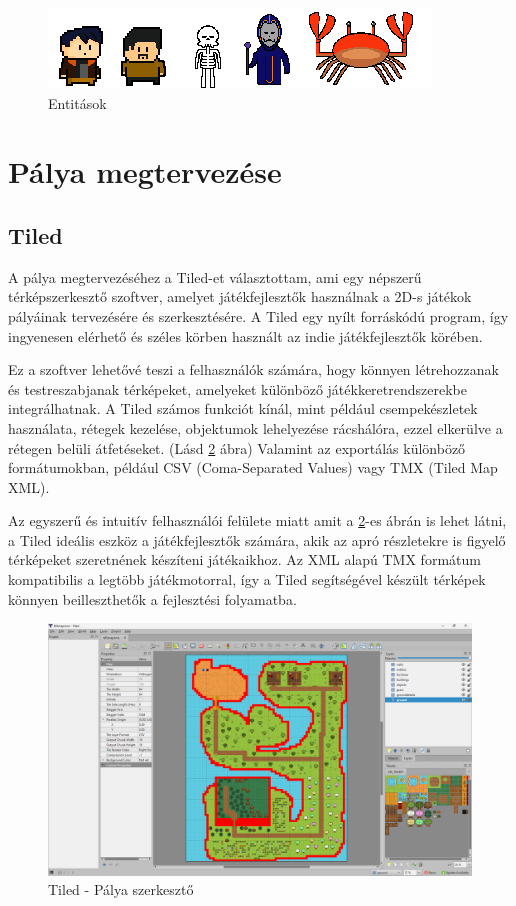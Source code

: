 \begin{figure}[H]
    \centering
    \includegraphics[width=12.0truecm]{images/entities.png}
    \caption{Entitások}
    \label{fig:Entitások}
\end{figure}


\section{Pálya megtervezése}

\subsection{Tiled}
\label{subsec:Tiled}
 A pálya megtervezéséhez a Tiled-et \cite{Tiled} választottam, ami egy népszerű térképszerkesztő szoftver, amelyet játékfejlesztők használnak a 2D-s játékok pályáinak tervezésére és szerkesztésére.   A Tiled egy nyílt forráskódú program, így ingyenesen elérhető és széles körben használt az indie játékfejlesztők körében.

Ez a szoftver lehetővé teszi a felhasználók számára, hogy könnyen létrehozzanak és testreszabjanak térképeket, amelyeket különböző játékkeretrendszerekbe integrálhatnak. A Tiled számos funkciót kínál, mint például csempekészletek használata, rétegek kezelése, objektumok lehelyezése rácshálóra, ezzel elkerülve a rétegen belüli átfetéseket. (Lásd \ref{fig:Tiled} ábra) Valamint az exportálás különböző formátumokban, például CSV (Coma-Separated Values) vagy TMX (Tiled Map XML).

Az egyszerű és intuitív felhasználói felülete miatt amit a \ref{fig:Tiled}-es ábrán is lehet látni, a Tiled ideális eszköz a játékfejlesztők számára, akik az apró részletekre is figyelő térképeket szeretnének készíteni játékaikhoz. Az XML alapú TMX formátum kompatibilis a legtöbb játékmotorral, így a Tiled segítségével készült térképek könnyen beilleszthetők a fejlesztési folyamatba.

\begin{figure}[H]
    \centering
    \includegraphics[width=14.0truecm]{images/Tiled.png}
    \caption{Tiled - Pálya szerkesztő
    \cite{Tiled}}
    \label{fig:Tiled}
\end{figure}

